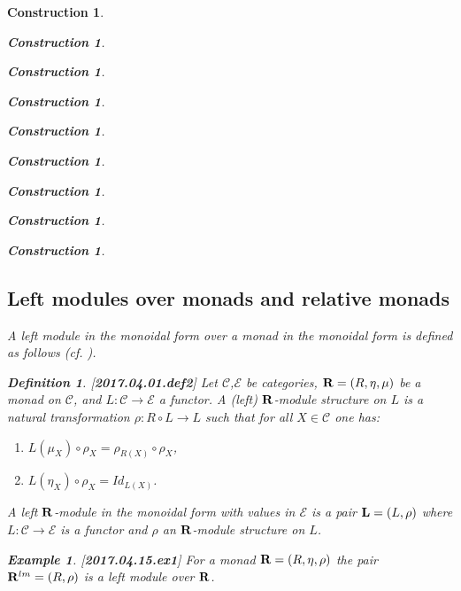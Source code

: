 \documentclass[12pt]{amsart}
\newtheorem{definition}[proposition]{Definition}
\newtheorem{example}[proposition]{Example}
\newtheorem{construction}[proposition]{Construction}
\newcommand{\llabel}[1]{\label{#1}[{\bf #1}]}
\newcommand{\sr}{\rightarrow}
\newcommand{\R}{{\bf R}}
\newcommand{\C}{{\mathcal C}}
\newcommand{\E}{{\mathcal E}}
\begin{document}
\begin{construction}
\begin{construction}
\begin{construction}
\begin{construction}
\begin{construction}
\begin{construction}
\begin{construction}
\begin{construction}
\begin{construction}
\subsection{Left modules over monads and relative monads}

%
A left module in the monoidal form over a monad in the monoidal form is defined as follows (cf. \cite[p.222]{HM2007}). 
%
\begin{definition}
\llabel{2017.04.01.def2}
Let $\C$,$\E$ be categories, $\R=(R,\eta,\mu)$ be a monad on $\C$, and $L:\C\sr \E$ a functor. A (left) $\R$-module structure on $L$ is a natural transformation $\rho:R\circ L\sr L$ such that for all $X\in\C$ one has:
%
\begin{enumerate}
\item $L(\mu_X)\circ \rho_X=\rho_{R(X)}\circ \rho_X$,
\item $L(\eta_X)\circ \rho_X=Id_{L(X)}$.
\end{enumerate}
%
A left $\R$-module in the monoidal form with values in $\E$ is a pair ${\bf L}=(L,\rho)$ where $L:\C\sr \E$ is a functor and $\rho$ an $\R$-module structure on $L$. 
\end{definition}
%
\begin{example}\llabel{2017.04.15.ex1}\rm
For a monad $\R=(R,\eta,\rho)$ the pair $\R^{lm}=(R,\rho)$ is a left module over $\R$.
\end{example}
%


\end{construction}
\end{construction}
\end{construction}
\end{construction}
\end{construction}
\end{construction}
\end{construction}
\end{construction}
\end{construction}
\end{document}
